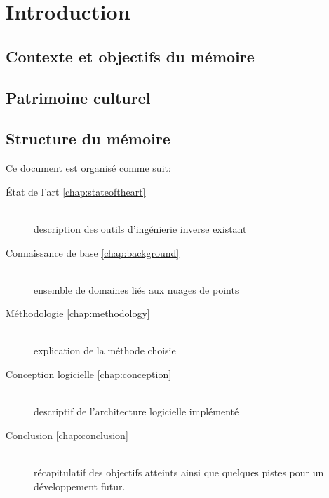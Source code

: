 \chapter{Introduction \label{chap:introduction}}

\section*{Contexte et objectifs du mémoire}




\section*{Patrimoine culturel}

\section*{Structure du mémoire}
Ce document est organisé comme suit:

\begin{description}
  \item[\'{E}tat de l'art \ref{chap:stateoftheart}] \hfill \\ description des outils d'ingénierie inverse existant
  \item[Connaissance de base \ref{chap:background}] \hfill \\ ensemble de domaines liés aux nuages de points
  \item[Méthodologie \ref{chap:methodology}] \hfill \\ explication de la méthode choisie
  \item[Conception logicielle \ref{chap:conception}] \hfill \\ descriptif de l'architecture logicielle implémenté
  \item[Conclusion \ref{chap:conclusion}] \hfill \\ récapitulatif des objectifs atteints ainsi que quelques pistes pour un développement futur.
\end{description}

